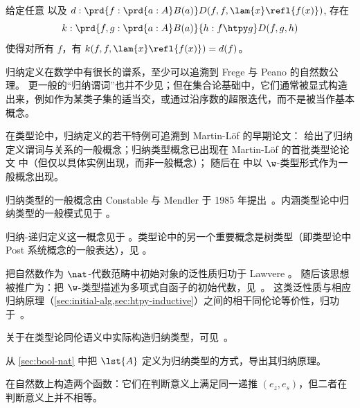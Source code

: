 \begin{cor}[同伦归纳]\label{thm:htpy-induction}
  给定任意  以及 $d:\prd{f:\prd{a:A} B(a)} D(f,f,\lam{x}\refl{f(x)})$, 存在
  \begin{equation*}
    k:\prd{f,g:\prd{a:A} B(a)}{h:f\htpy g} D(f,g,h)
  \end{equation*}
  使得对所有 $f$，有 $k(f,f,\lam{x}\refl{f(x)}) = d(f)$。
\end{cor}

\sectionNotes

归纳定义在数学中有很长的谱系，至少可以追溯到 Frege 与 Peano 的自然数公理。 %
更一般的“归纳谓词”也并不少见；但在集合论基础中，它们通常被显式构造出来，例如作为某类子集的适当交，或通过沿序数的超限迭代，而不是被当作基本概念。

在类型论中，归纳定义的若干特例可追溯到 Martin-L\"of 的早期论文：\cite{martin-lof-hauptsatz} 给出了归纳定义谓词与关系的一般概念；归纳类型概念已出现在 Martin-L\"of 的首批类型论论文 \cite{Martin-Lof-1973} 中（但仅以具体实例出现，而非一般概念）；
随后在 \cite{Martin-Lof-1979} 中以 $\w$-类型形式作为一般概念出现。%

归纳类型的一般概念由 Constable 与 Mendler 于 1985 年提出~\cite{DBLP:conf/lop/ConstableM85}。内涵类型论中归纳类型的一般模式见于
\cite{PfenningPaulinMohring, CoquandPaulin, Dybjer:1991}。

归纳-递归定义这一概念见于 \cite{Dybjer:2000}。类型论中的另一个重要概念是树类型（即类型论中 Post 系统概念的一般表达），见 \cite{PeterssonSynek}。

把自然数作为 $\nat$-代数范畴中初始对象的泛性质归功于 Lawvere \cite{lawvere:adjinfound}。
随后该思想被推广为：把 $\w$-类型描述为多项式自函子的初始代数，见~\cite{mp:wftrees}。
这类泛性质与相应归纳原理（\cref{sec:initial-alg,sec:htpy-inductive}）之间的相干同伦论等价性，归功于~\cite{ags:it-hott}。

关于在类型论同伦语义中实际构造归纳类型，可见~\cite{klv:ssetmodel,mvdb:wtypes,ls:hits}。

\sectionExercises

\begin{ex}\label{ex:ind-lst}
  从 \cref{sec:bool-nat} 中把 $\lst{A}$ 定义为归纳类型的方式，导出其归纳原理。
\end{ex}

\begin{ex}\label{ex:same-recurrence-not-defeq}
  在自然数上构造两个函数：它们在判断意义上满足同一递推 $(e_z, e_s)$，但二者在判断意义上并不相等。
\end{ex}

